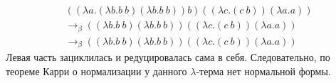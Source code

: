 \documentclass[12pt,a4paper]{article}
\begin{document}
$$
\begin{aligned}
&((\lambda a.(\lambda b. b~b)(\lambda b.b~b) ) b)((\lambda c.(c~b))(\lambda a.a)) \\
&\to_\beta ((\lambda b. b~b)(\lambda b.b~b))((\lambda c.(c~b))(\lambda a.a)) \\
&\to_\beta ((\lambda b. b~b)(\lambda b.b~b))((\lambda c.(c~b))(\lambda a.a))
\end{aligned}
$$
Левая часть зациклилась и редуцировалась сама в себя. Следовательно, по теореме Карри о нормализации у данного $\lambda$-терма нет нормальной формы.
\end{document}
